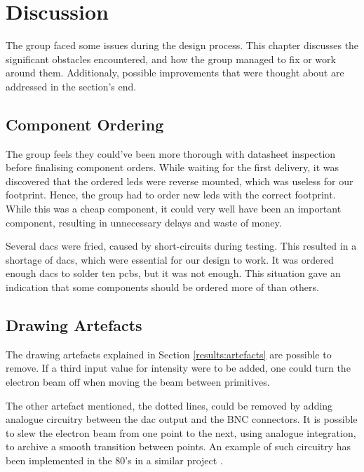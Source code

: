 \chapter{Discussion}

The group faced some issues during the design process. 
This chapter discusses the significant obstacles encountered, and how the group managed to fix or work around them. 
Additionaly, possible improvements that were thought about are addressed in the section's end.



\section{Component Ordering}
The group feels they could've been more thorough with datasheet inspection before finalising component orders. 
While waiting for the first delivery, it was discovered that the ordered \gls{led}s were reverse mounted, which was useless for our footprint. 
Hence, the group had to order new \gls{led}s with the correct footprint. 
While this was a cheap component, it could very well have been an important component, resulting in unnecessary delays and waste of money.

Several \gls{dac}s were fried, caused by short-circuits during testing. 
This resulted in a shortage of \gls{dac}s, which were essential for our design to work.
It was ordered enough \gls{dac}s to solder ten \gls{pcb}s, but it was not enough. 
This situation gave an indication that some components should be ordered more of than others.



\section{Drawing Artefacts}
\label{discussion:artefacts}
The drawing artefacts explained in Section \ref{results:artefacts} are possible to remove.
If a third input value for intensity were to be added, one could turn the electron beam off when moving the beam between primitives.

The other artefact mentioned, the dotted lines, could be removed by adding analogue circuitry between the \gls{dac} output and the BNC connectors.
It is possible to slew the electron beam from one point to the next, using analogue integration, to archive a smooth transition between points.
An example of such circuitry has been implemented in the 80's in a similar project \cite{vector-graphic-crt}.

